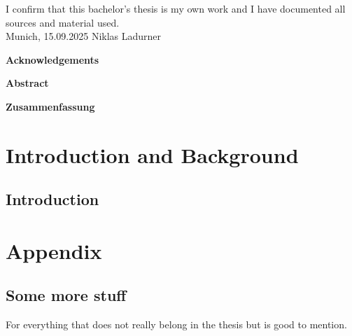 \documentclass[11pt,
               a4paper,
               bibtotoc,
               idxtotoc,
               headsepline,
               footsepline,
               footexclude,
               BCOR12mm,
               DIV13,
               openany
               ]
               {scrbook}
\def\doctype{Bachelor's Thesis\xspace}
\def\author{Niklas Ladurner}
\def\date{15.09.2025}
\begin{document}
\addtolength{\hoffset}{\bcorcor}
\newpage

% 
%

\cleardoubleemptypage

\thispagestyle{empty}
\vspace*{0.7\textheight}
\noindent
I confirm that this \MakeLowercase{\doctype} is my own work and I have documented all sources and material used.\\

\vspace{15mm}
\noindent
Munich, \date \hspace{5cm} \author
\cleardoubleemptypage

%
%

{}
\vspace*{2cm}
\begin{center}
	{\Large \bf Acknowledgements}
\end{center}
\vspace{1cm}

\lipsum[1]

\cleardoublepage

%
%

{}
\vspace*{2cm}
\begin{center}
	{\Large \bf Abstract}
\end{center}
\vspace{1cm}

\lipsum[2]

\cleardoublepage

{}
\vspace*{2cm}
\begin{center}
	{\Large \bf Zusammenfassung}
\end{center}
\vspace{1cm}

\lipsum[2]

\cleardoublepage

%
%

\tableofcontents
\thispagestyle{empty}
\cleardoubleemptypage

%
%

\mainmatter
\part{Introduction and Background}
\chapter{Introduction}

\appendix
\part{Appendix}
\chapter{Some more stuff}

For everything that does not really belong in the thesis but is good to mention.

\listoffigures

\listoftables



\end{document}
